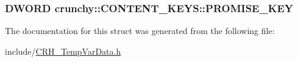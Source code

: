 \subsubsection[{P\+R\+O\+M\+I\+S\+E\+\_\+\+K\+EY}]{\setlength{\rightskip}{0pt plus 5cm}D\+W\+O\+RD crunchy\+::\+C\+O\+N\+T\+E\+N\+T\+\_\+\+K\+E\+Y\+S\+::\+P\+R\+O\+M\+I\+S\+E\+\_\+\+K\+EY}\hypertarget{structcrunchy_1_1_c_o_n_t_e_n_t___k_e_y_s_a37a28b896918cb39a79d25d469506c7a}{}\label{structcrunchy_1_1_c_o_n_t_e_n_t___k_e_y_s_a37a28b896918cb39a79d25d469506c7a}


The documentation for this struct was generated from the following file\+:\begin{DoxyCompactItemize}
\item 
include/\hyperlink{_c_r_h___temp_var_data_8h}{C\+R\+H\+\_\+\+Temp\+Var\+Data.\+h}\end{DoxyCompactItemize}

